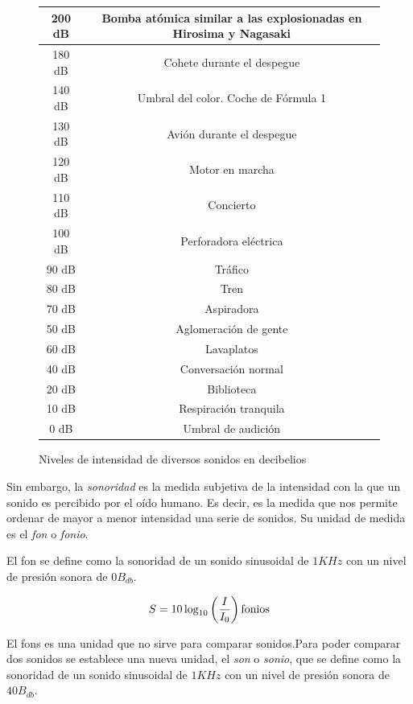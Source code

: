 \documentclass[11pt,a4paper]{article}
\begin{document}
	
	\begin{figure}[h]
	    \centering
	    \begin{tabular}{|c|c|}
	        \hline
	        200 dB & Bomba atómica similar a las explosionadas en Hirosima y Nagasaki \\ \hline
	        180 dB & Cohete durante el despegue \\ \hline
	        140 dB & Umbral del color. Coche de Fórmula 1 \\ \hline
	        130 dB & Avión durante el despegue \\ \hline
	        120 dB & Motor en marcha \\ \hline
	        110 dB & Concierto \\ \hline
	        100 dB & Perforadora eléctrica \\ \hline
	        90 dB & Tráfico \\ \hline
	        80 dB & Tren \\ \hline
	        70 dB & Aspiradora \\ \hline
	        50 dB & Aglomeración de gente \\ \hline
	        60 dB & Lavaplatos \\ \hline
	        40 dB & Conversación normal \\ \hline
	        20 dB & Biblioteca \\ \hline
	        10 dB & Respiración tranquila \\ \hline
	        0 dB & Umbral de audición  \\ \hline	        	        
	    \end{tabular}
	    \caption{Niveles de intensidad de diversos sonidos en decibelios}
	\end{figure}
	
	Sin embargo, la \emph{sonoridad} es la medida subjetiva de la intensidad con la que un sonido es percibido por el oído humano. Es decir, es la medida que nos permite ordenar de mayor a menor intensidad una serie de sonidos. Su unidad de medida es el \emph{fon} o \emph{fonio}.
	
	El fon se define como la sonoridad de un sonido sinusoidal de $1 KHz$ con un nivel de presión sonora de $0 B_{db}$. 
	
	$$
		S = 10 \log_{10} \left( \frac{I}{I_{0}} \right)   \hbox{fonios}
	$$
	
	El fons es una unidad que no sirve para comparar sonidos.Para poder comparar dos sonidos se establece una nueva unidad, el \emph{son} o \emph{sonio}, que se define como la sonoridad de un sonido sinusoidal de $1 KHz$ con un nivel de presión sonora de $40 B_{db}$.
	
\end{document}
